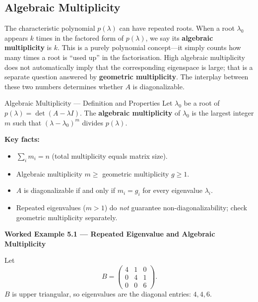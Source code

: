 \documentclass[12pt,a4paper]{article}
\begin{document}
\subsection{Algebraic Multiplicity}

The characteristic polynomial $p(\lambda)$ can have repeated roots. When a root $\lambda_0$
appears $k$ times in the factored form of $p(\lambda)$, we say its \textbf{algebraic multiplicity}
is $k$. This is a purely polynomial concept---it simply counts how many times a root is
``used up'' in the factorisation. High algebraic multiplicity does not automatically imply
that the corresponding eigenspace is large; that is a separate question answered by
\textbf{geometric multiplicity}. The interplay between these two numbers determines
whether $A$ is diagonalizable.

\begin{infobox}{Algebraic Multiplicity --- Definition and Properties}
Let $\lambda_0$ be a root of $p(\lambda)=\det(A-\lambda I)$. The \textbf{algebraic multiplicity} of
$\lambda_0$ is the largest integer $m$ such that $(\lambda - \lambda_0)^m$ divides $p(\lambda)$.

\textbf{Key facts:}
\begin{itemize}[leftmargin=*]
  \item $\sum_i m_i = n$ (total multiplicity equals matrix size).
  \item Algebraic multiplicity $m \geq$ geometric multiplicity $g \geq 1$.
  \item $A$ is diagonalizable if and only if $m_i = g_i$ for every eigenvalue $\lambda_i$.
  \item Repeated eigenvalues ($m > 1$) do \emph{not} guarantee non-diagonalizability;
        check geometric multiplicity separately.
\end{itemize}
\end{infobox}

\textbf{Worked Example 5.1 --- Repeated Eigenvalue and Algebraic Multiplicity}

Let
\[
  B = \begin{pmatrix} 4 & 1 & 0 \\ 0 & 4 & 1 \\ 0 & 0 & 6 \end{pmatrix}.
\]
$B$ is upper triangular, so eigenvalues are the diagonal entries: $4, 4, 6$.
\end{document}
